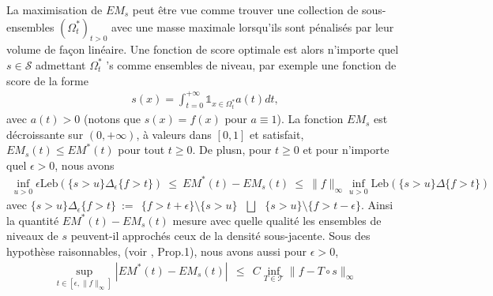 \documentclass[a4paper, 12pt]{article}
\def\S{\mathcal{S}}
\def\leb{\text{Leb}}
\begin{document}
%
\begin{center}
\label{resume_fr:EMcurve}
\end{center}
%
\noindent
La maximisation de $ EM_s $ peut être vue comme trouver une collection de sous-ensembles $ (\Omega ^ * _ t) _ {t> 0} $ avec une masse maximale lorsqu'ils sont pénalisés par leur volume de façon linéaire. Une fonction de score optimale est alors n'importe quel $ s \in \S $ admettant $ \Omega^*_t $ 's comme ensembles de niveau, par exemple une fonction de score de la forme
\begin{align*}
s(x)=\int_{t=0}^{+\infty} \mathds{1}_{x\in \Omega^*_t}a(t)dt,\end{align*}
avec $a(t)>0$ (notons que $s(x)=f(x)$ pour $a \equiv 1$).
%
La fonction $EM_s$ est décroissante sur $(0,+\infty)$, à valeurs dans $[0,1]$ et satisfait, $EM_s(t) \le EM^*(t)$ pour tout $t\geq 0$. 
De plusn, pour $t \ge 0$ et pour n'importe quel $\epsilon > 0$, nous avons 
\begin{align*}
\inf_{u>0} \epsilon \leb (\{ s >u\}\Delta_\epsilon \{f>t\}) ~\le~ EM^*(t)-EM_s(t) ~\le~ \|f\|_\infty \inf_{u>0} \leb (\{ s >u\}\Delta\{f>t\})
\end{align*}
avec $\{ s >u\}\Delta_\epsilon \{f>t\} ~:=~~ \{f>t+\epsilon\} \setminus \{ s >u\} ~~~\bigsqcup~~~ \{ s >u\} \setminus \{f>t-\epsilon\}$. Ainsi la quantité $EM^*(t)-EM_s(t)$ mesure avec quelle qualité les ensembles de niveaux de $s$ peuvent-il approchés ceux de la densité sous-jacente.
Sous des hypothèse raisonnables, (voir \cite{AISTAT15}, Prop.1), nous avons aussi pour $\epsilon >0$, 
\begin{align*}
\sup_{t\in[\epsilon ,\|f\|_\infty]}|EM^*(t)-EM_s(t)| ~~\le~~  C \inf_{T  \in \mathcal{T}} \|f-T\circ s\|_\infty
\end{align*}
\end{document}
